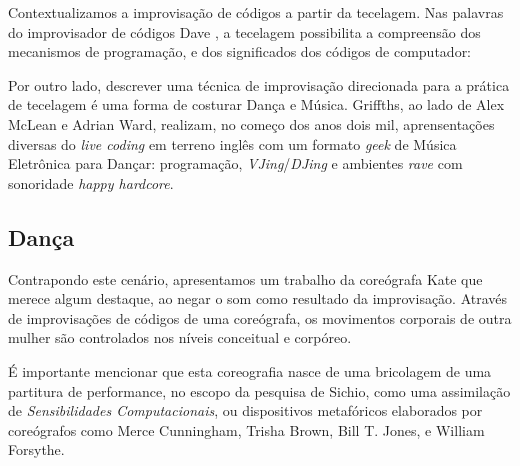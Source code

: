 Contextualizamos a improvisação de códigos a partir da tecelagem. Nas palavras do improvisador de códigos Dave , a tecelagem possibilita a compreensão dos mecanismos de programação, e dos significados dos códigos de computador:


Por outro lado, descrever uma técnica de improvisação direcionada para a prática de tecelagem é uma forma de costurar Dança e Música. Griffths, ao lado de Alex McLean e Adrian Ward, realizam, no começo dos anos dois mil, aprensentações diversas do \emph{live coding} em terreno inglês com um formato \emph{geek} de Música Eletrônica para Dançar: programação, \emph{VJing}/\emph{DJing} e ambientes \emph{rave} com sonoridade \emph{happy hardcore}. %

\subsection*{Dança}

Contrapondo este cenário, apresentamos um trabalho da coreógrafa Kate  que merece algum destaque, ao negar o som como resultado da improvisação. Através de improvisações de códigos de uma coreógrafa, os movimentos corporais de outra mulher são controlados nos níveis conceitual e corpóreo.

É importante mencionar que esta coreografia nasce de uma bricolagem de uma partitura de performance, no escopo da pesquisa de Sichio, como uma assimilação de \emph{Sensibilidades Computacionais}, ou dispositivos metafóricos elaborados por coreógrafos como Merce Cunningham, Trisha Brown, Bill T. Jones, e William Forsythe.

